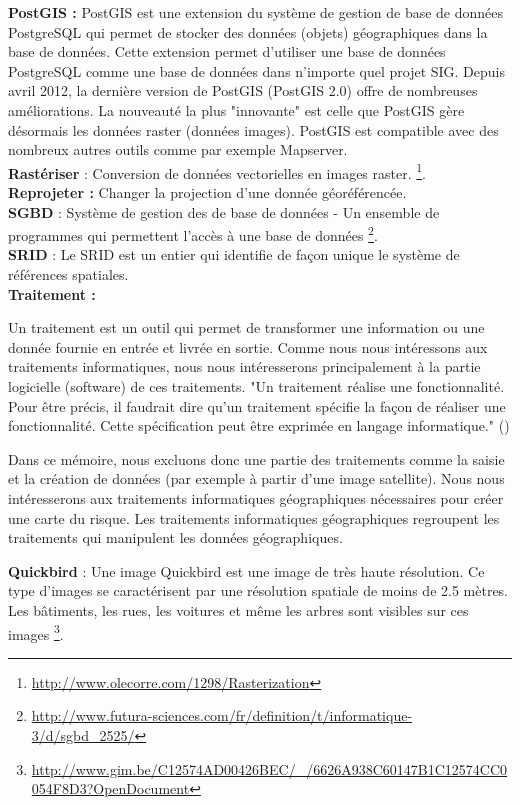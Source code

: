 \textbf{PostGIS : }
PostGIS est une extension du système de gestion de base de données PostgreSQL qui permet de stocker des données (objets) géographiques dans la base de données. Cette extension permet d'utiliser une base de données PostgreSQL comme une base de données dans n'importe quel projet SIG. Depuis avril 2012, la dernière version de PostGIS (PostGIS 2.0) offre de nombreuses améliorations. La nouveauté la plus "innovante" est celle que PostGIS gère désormais les données raster (données images).
PostGIS est compatible avec des nombreux autres outils comme par exemple Mapserver.\\

\textbf{Rastériser} : Conversion de données vectorielles en images raster.  \footnote{\url{http://www.olecorre.com/1298/Rasterization}}.\\

\textbf{Reprojeter : } Changer la projection d'une donnée géoréférencée.\\


\textbf{SGBD} : Système de gestion des de base de données - Un ensemble de programmes qui permettent l'accès à une base de données \footnote{\url{http://www.futura-sciences.com/fr/definition/t/informatique-3/d/sgbd_2525/}}.\\

\textbf{SRID} : Le SRID est un entier qui identifie de façon unique le système de références spatiales.\\


\textbf{Traitement : }

Un traitement est un outil qui permet de transformer une information ou une donnée fournie en entrée et livrée en sortie. Comme nous nous intéressons aux traitements informatiques, nous nous intéresserons principalement à la partie logicielle (software) de ces traitements.
"Un traitement réalise une fonctionnalité. Pour être précis, il faudrait dire qu'un traitement spécifie la façon de réaliser une fonctionnalité. Cette spécification peut être exprimée en langage informatique." (\citep{ElKader2006})

Dans ce mémoire, nous excluons donc une partie des traitements comme la saisie et la création de données (par exemple à partir d'une image satellite). Nous nous intéresserons aux traitements informatiques géographiques nécessaires pour créer une carte du risque.
Les traitements informatiques géographiques regroupent les traitements qui manipulent les données géographiques. 

\textbf{Quickbird} :  Une image Quickbird est une image de très haute résolution. Ce type d'images se caractérisent par une résolution spatiale de moins de 2.5 mètres. Les bâtiments, les rues, les voitures et même les arbres sont visibles sur ces images \footnote{\url{http://www.gim.be/C12574AD00426BEC/_/6626A938C60147B1C12574CC0054F8D3?OpenDocument}}.\\


